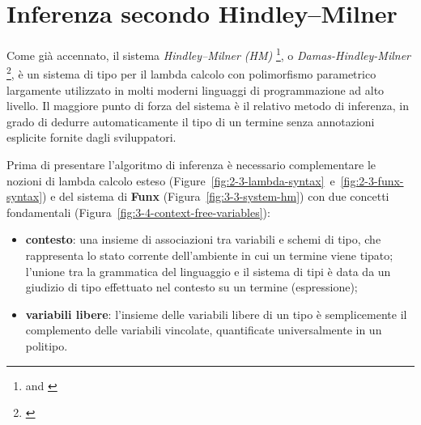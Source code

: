 \section{Inferenza secondo Hindley–Milner}
\label{sec:3-4-hm-type-inference}

Come già accennato, il sistema \textit{Hindley–Milner (HM)}%
\footnote{ \cite{Hindley-1969-SchemeObject}
    and  \cite{Milner-1978-TheoryPolymorphism}},
o \textit{Damas-Hindley-Milner}%
\footnote{ \cite{Damas-1982-PrincipalSchemes}},
è un sistema di tipo per il lambda calcolo con polimorfismo parametrico largamente utilizzato
in molti moderni linguaggi di programmazione ad alto livello. Il maggiore punto di forza del sistema
è il relativo metodo di inferenza, in grado di dedurre automaticamente il tipo di un termine
senza annotazioni esplicite fornite dagli sviluppatori.


Prima di presentare l'algoritmo di inferenza è necessario complementare le nozioni di lambda calcolo esteso
(Figure~\ref{fig:2-3-lambda-syntax}~e~\ref{fig:2-3-funx-syntax}) e del sistema di \textbf{Funx} (Figura~\ref{fig:3-3-system-hm})
con due concetti fondamentali (Figura~\ref{fig:3-4-context-free-variables}):
\begin{itemize}
    \item \textbf{contesto}: una insieme di associazioni tra variabili e schemi di tipo,
          che rappresenta lo stato corrente dell'ambiente in cui un termine viene tipato; l'unione tra la grammatica
          del linguaggio e il sistema di tipi è data da un giudizio di tipo effettuato nel contesto su un termine (espressione);
    \item \textbf{variabili libere}: l'insieme delle variabili libere di un tipo è semplicemente il complemento
          delle variabili vincolate, quantificate universalmente in un politipo.
\end{itemize}


